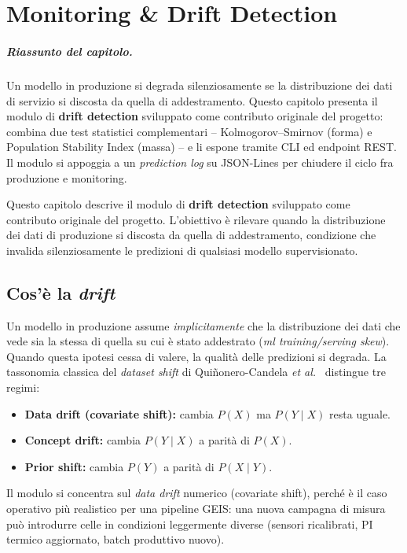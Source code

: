 \chapter{Monitoring \& Drift Detection}
\label{chap:monitoring}

\paragraph{Riassunto del capitolo.} Un modello in produzione si degrada
silenziosamente se la distribuzione dei dati di servizio si discosta da
quella di addestramento. Questo capitolo presenta il modulo di
\textbf{drift detection} sviluppato come contributo originale del
progetto: combina due test statistici complementari -- Kolmogorov–Smirnov
(forma) e Population Stability Index (massa) -- e li espone tramite CLI
ed endpoint REST. Il modulo si appoggia a un \emph{prediction log} su
JSON-Lines per chiudere il ciclo fra produzione e monitoring.

Questo capitolo descrive il modulo di \textbf{drift detection} sviluppato
come contributo originale del progetto. L'obiettivo è rilevare quando la
distribuzione dei dati di produzione si discosta da quella di
addestramento, condizione che invalida silenziosamente le predizioni di
qualsiasi modello supervisionato.

\section{Cos'è la \emph{drift}}

Un modello in produzione assume \emph{implicitamente} che la
distribuzione dei dati che vede sia la stessa di quella su cui è stato
addestrato (\emph{\acrshort{ml} \emph{training/serving skew}}). Quando
questa ipotesi cessa di valere, la qualità delle predizioni si degrada.
La tassonomia classica del \emph{dataset shift} di Quiñonero-Candela
\emph{et al.}~\cite{quinonero2008dataset} distingue tre regimi:
\begin{itemize}
  \item \textbf{Data drift (covariate shift):} cambia $P(X)$ ma
        $P(Y \mid X)$ resta uguale.
  \item \textbf{Concept drift:} cambia $P(Y \mid X)$ a parità di $P(X)$.
  \item \textbf{Prior shift:} cambia $P(Y)$ a parità di $P(X \mid Y)$.
\end{itemize}

Il modulo  si concentra sul \emph{data
drift} numerico (covariate shift), perché è il caso operativo più
realistico per una pipeline GEIS: una nuova campagna di misura può
introdurre celle in condizioni leggermente diverse (sensori ricalibrati,
PI termico aggiornato, batch produttivo nuovo).

